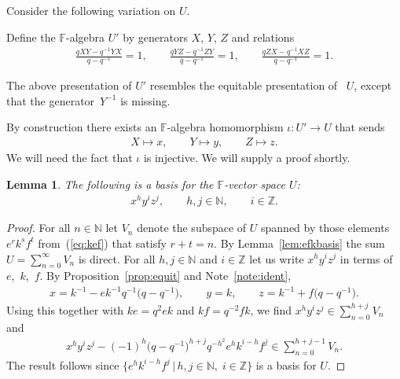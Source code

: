\documentclass[pdftex]{sigma}
\numberwithin{equation}{section}
\newtheorem{Lemma}[Theorem]{Lemma}
\begin{document}
Consider  the following variation on
$U$.

\begin{Definition}
\label{def:umod}
Def\/ine the $\mathbb F$-algebra
$U'$ by generators $X$, $Y$, $Z$ and
relations
\begin{gather*}
\frac{qXY-q^{-1}YX}{q-q^{-1}} = 1,
\qquad
\frac{qYZ-q^{-1}ZY}{q-q^{-1}} = 1,
\qquad
\frac{qZX-q^{-1}XZ}{q-q^{-1}} = 1.
\end{gather*}
\end{Definition}

 The above presentation
of $U'$ resembles
the equitable presentation of~ $U$, except that the generator~$Y^{-1}$
 is missing.

By construction
there exists an $\mathbb F$-algebra homomorphism
$\iota :
U'
\to
U$
that sends
\begin{gather*}
X \mapsto x,
\qquad
Y \mapsto y,
\qquad
Z \mapsto z.
\end{gather*}
We will need the fact that
$\iota$
is injective.
We will supply a proof shortly.

\begin{Lemma}
\label{lem:xyzbasis}
The following is a basis for the $\mathbb F$-vector space
$U$:
\begin{gather*}
x^h y^i z^j, \qquad h,j \in \mathbb N ,\qquad   i \in \mathbb Z.
\end{gather*}
\end{Lemma}
\begin{proof}
For all $n \in \mathbb N$ let
$V_n$ denote the subspace of
$U$ spanned by those
elements
$e^rk^sf^t$ from~(\ref{eq:kef}) that satisfy
 $r+t=n$.
By
Lemma~\ref{lem:efkbasis}
the
sum $U=
\sum\limits_{n=0}^\infty V_n$ is direct.
For all $h,j\in \mathbb N$ and $i \in \mathbb Z$
let us write $x^hy^iz^j$ in terms of~$e$,~$k$,~$f$.
By Proposition~\ref{prop:equit} and
Note~\ref{note:ident},
\begin{gather*}
x =
k^{-1} - e k^{-1} q^{-1}\big(q-q^{-1}\big),
\qquad   y=k,
\qquad
z = k^{-1}+ f\big(q-q^{-1}\big).
\end{gather*}
Using this together with
$ke=q^2ek$ and $kf=q^{-2}fk$, we f\/ind
$x^hy^iz^j  \in \sum\limits_{n=0}^{h+j} V_n $
and
\begin{gather*}
x^hy^iz^j  -
(-1)^h \big(q-q^{-1}\big)^{h+j}q^{-h^2} e^h k^{i-h} f^j
\in \sum_{n=0}^{h+j-1} V_n.
\end{gather*}
The result follows since
$\lbrace e^hk^{i-h}f^j\,|\, h,j\in \mathbb N, \; i\in \mathbb Z\rbrace$
is a basis for
$U$.
\end{proof}
\end{document}
